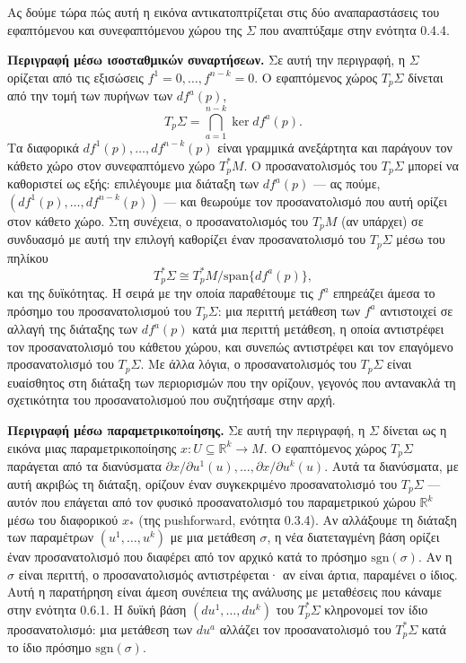 \documentclass[12pt]{article}
\begin{document}
Ας δούμε τώρα πώς αυτή η εικόνα αντικατοπτρίζεται στις δύο αναπαραστάσεις του εφαπτόμενου και συνεφαπτόμενου χώρου της $\Sigma$ που αναπτύξαμε στην ενότητα 0.4.4.

\textbf{Περιγραφή μέσω ισοσταθμικών συναρτήσεων.} Σε αυτή την περιγραφή, η $\Sigma$ ορίζεται από τις εξισώσεις $f^1 = 0, \dots, f^{n-k} = 0$. Ο εφαπτόμενος χώρος $T_p\Sigma$ δίνεται από την τομή των πυρήνων των $df^a(p)$,
\[
T_p\Sigma = \bigcap_{a=1}^{n-k} \ker df^a(p).
\]
Τα διαφορικά $df^1(p), \dots, df^{n-k}(p)$ είναι γραμμικά ανεξάρτητα και παράγουν τον κάθετο χώρο στον συνεφαπτόμενο χώρο $T_p^*M$. Ο προσανατολισμός του $T_p\Sigma$ μπορεί να καθοριστεί ως εξής: επιλέγουμε μια διάταξη των $df^a(p)$ --- ας πούμε, $(df^1(p), \dots, df^{n-k}(p))$ --- και θεωρούμε τον προσανατολισμό που αυτή ορίζει στον κάθετο χώρο. Στη συνέχεια, ο προσανατολισμός του $T_pM$ (αν υπάρχει) σε συνδυασμό με αυτή την επιλογή καθορίζει έναν προσανατολισμό του $T_p\Sigma$ μέσω του πηλίκου
\[
T_p^*\Sigma \cong T_p^*M / \text{span}\{df^a(p)\},
\]
και της δυϊκότητας. Η σειρά με την οποία παραθέτουμε τις $f^a$ επηρεάζει άμεσα το πρόσημο του προσανατολισμού του $T_p\Sigma$: μια περιττή μετάθεση των $f^a$ αντιστοιχεί σε αλλαγή της διάταξης των $df^a(p)$ κατά μια περιττή μετάθεση, η οποία αντιστρέφει τον προσανατολισμό του κάθετου χώρου, και συνεπώς αντιστρέφει και τον επαγόμενο προσανατολισμό του $T_p\Sigma$. Με άλλα λόγια, ο προσανατολισμός του $T_p\Sigma$ είναι ευαίσθητος στη διάταξη των περιορισμών που την ορίζουν, γεγονός που αντανακλά τη σχετικότητα του προσανατολισμού που συζητήσαμε στην αρχή.

\textbf{Περιγραφή μέσω παραμετρικοποίησης.} Σε αυτή την περιγραφή, η $\Sigma$ δίνεται ως η εικόνα μιας παραμετρικοποίησης $x: U \subseteq \mathbb{R}^k \to M$. Ο εφαπτόμενος χώρος $T_p\Sigma$ παράγεται από τα διανύσματα $\partial x / \partial u^1(u), \dots, \partial x / \partial u^k(u)$. Αυτά τα διανύσματα, με αυτή ακριβώς τη διάταξη, ορίζουν έναν συγκεκριμένο προσανατολισμό του $T_p\Sigma$ --- αυτόν που επάγεται από τον φυσικό προσανατολισμό του παραμετρικού χώρου $\mathbb{R}^k$ μέσω του διαφορικού $x_*$ (της pushforward, ενότητα 0.3.4). Αν αλλάξουμε τη διάταξη των παραμέτρων $(u^1, \dots, u^k)$ με μια μετάθεση $\sigma$, η νέα διατεταγμένη βάση ορίζει έναν προσανατολισμό που διαφέρει από τον αρχικό κατά το πρόσημο $\text{sgn}(\sigma)$. Αν η $\sigma$ είναι περιττή, ο προσανατολισμός αντιστρέφεται· αν είναι άρτια, παραμένει ο ίδιος. Αυτή η παρατήρηση είναι άμεση συνέπεια της ανάλυσης με μεταθέσεις που κάναμε στην ενότητα 0.6.1. Η δυϊκή βάση $(du^1, \dots, du^k)$ του $T_p^*\Sigma$ κληρονομεί τον ίδιο προσανατολισμό: μια μετάθεση των $du^a$ αλλάζει τον προσανατολισμό του $T_p^*\Sigma$ κατά το ίδιο πρόσημο $\text{sgn}(\sigma)$.
\end{document}
